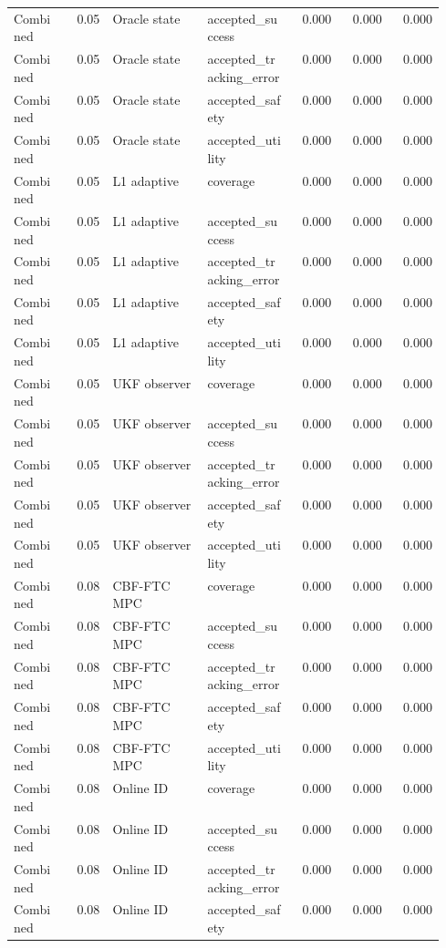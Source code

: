 \documentclass{article}
\begin{document}
\begin{center}
\begin{longtable}{p{0.13\linewidth}rp{0.22\linewidth}p{0.20\linewidth}rrr}
Combined & 0.05 & Oracle state & accepted\_success & 0.000 & 0.000 & 0.000\\
Combined & 0.05 & Oracle state & accepted\_tracking\_error & 0.000 & 0.000 & 0.000\\
Combined & 0.05 & Oracle state & accepted\_safety & 0.000 & 0.000 & 0.000\\
Combined & 0.05 & Oracle state & accepted\_utility & 0.000 & 0.000 & 0.000\\
Combined & 0.05 & L1 adaptive & coverage & 0.000 & 0.000 & 0.000\\
Combined & 0.05 & L1 adaptive & accepted\_success & 0.000 & 0.000 & 0.000\\
Combined & 0.05 & L1 adaptive & accepted\_tracking\_error & 0.000 & 0.000 & 0.000\\
Combined & 0.05 & L1 adaptive & accepted\_safety & 0.000 & 0.000 & 0.000\\
Combined & 0.05 & L1 adaptive & accepted\_utility & 0.000 & 0.000 & 0.000\\
Combined & 0.05 & UKF observer & coverage & 0.000 & 0.000 & 0.000\\
Combined & 0.05 & UKF observer & accepted\_success & 0.000 & 0.000 & 0.000\\
Combined & 0.05 & UKF observer & accepted\_tracking\_error & 0.000 & 0.000 & 0.000\\
Combined & 0.05 & UKF observer & accepted\_safety & 0.000 & 0.000 & 0.000\\
Combined & 0.05 & UKF observer & accepted\_utility & 0.000 & 0.000 & 0.000\\
Combined & 0.08 & CBF-FTC MPC & coverage & 0.000 & 0.000 & 0.000\\
Combined & 0.08 & CBF-FTC MPC & accepted\_success & 0.000 & 0.000 & 0.000\\
Combined & 0.08 & CBF-FTC MPC & accepted\_tracking\_error & 0.000 & 0.000 & 0.000\\
Combined & 0.08 & CBF-FTC MPC & accepted\_safety & 0.000 & 0.000 & 0.000\\
Combined & 0.08 & CBF-FTC MPC & accepted\_utility & 0.000 & 0.000 & 0.000\\
Combined & 0.08 & Online ID & coverage & 0.000 & 0.000 & 0.000\\
Combined & 0.08 & Online ID & accepted\_success & 0.000 & 0.000 & 0.000\\
Combined & 0.08 & Online ID & accepted\_tracking\_error & 0.000 & 0.000 & 0.000\\
Combined & 0.08 & Online ID & accepted\_safety & 0.000 & 0.000 & 0.000\\

\end{longtable}
\end{center}
\end{document}
